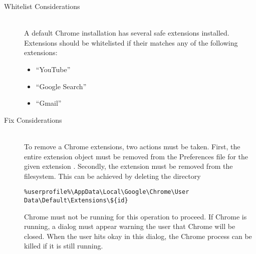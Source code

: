 \begin{description}
\item[Whitelist Considerations] \hfill \\
A default Chrome installation has several safe extensions installed.  Extensions
should be whitelisted if their  matches any of the following
extensions:
\begin{itemize}
\item ``YouTube''
\item ``Google Search''
\item ``Gmail''
\end{itemize}
\item[Fix Considerations] \hfill \\
To remove a Chrome extensions, two actions must be taken.  First, the entire
extension object must be removed from the Preferences file for the given
extension .  Secondly, the extension must be removed from the
filesystem.  This can be achieved by deleting the directory 
\vspace{-\baselineskip}
\begin{verbatim}
%userprofile%\AppData\Local\Google\Chrome\User Data\Default\Extensions\${id}
\end{verbatim}

Chrome must not be running for this operation to proceed.  If Chrome is running,
a dialog must appear warning the user that Chrome will be closed.  When the
user hits okay in this dialog, the Chrome process can be killed if it is still
running.  
\end{description}

